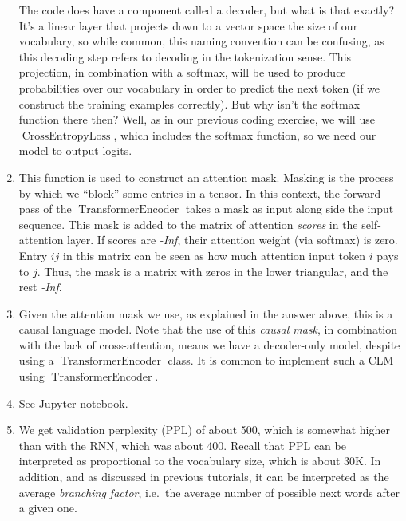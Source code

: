 \documentclass[11pt,a4paper]{article}
\newcommand\op[1]{\operatorname{#1}}
\begin{document}
\begin{enumerate}[label=(\alph*)]
          The code does have a component called a decoder, but what is that
          exactly?
          It's a linear layer that projects down to a vector space the size of
          our vocabulary, so while common, this naming convention can be
          confusing, as this decoding step refers to decoding in the
          tokenization sense.
          This projection, in combination with a softmax, will be used to
          produce probabilities over our vocabulary in order to predict the next
          token (if we construct the training examples correctly).
          But why isn't the softmax function there then?
          Well, as in our previous coding exercise, we will use
          $\op{CrossEntropyLoss}$, which includes the softmax function, so we
          need our model to output logits.
    \item This function is used to construct an attention mask.
          Masking is the process by which we ``block'' some entries in a tensor.
          In this context, the forward pass of the $\op{TransformerEncoder}$
          takes a mask as input along side the input sequence.
          This mask is added to the matrix of attention \emph{scores} in the
          self-attention layer.
          If scores are \emph{-Inf}, their attention weight (via softmax) is
          zero.
          Entry $ij$ in this matrix can be seen as how much attention input
          token $i$ pays to $j$.
          Thus, the mask is a matrix with zeros in the lower triangular, and
          the rest \emph{-Inf}.
    \item Given the attention mask we use, as explained in the answer above,
          this is a causal language model.
          Note that the use of this \emph{causal mask}, in combination with the
          lack of cross-attention, means we have a decoder-only model, despite
          using a $\op{TransformerEncoder}$ class.
          It is common to implement such a CLM using $\op{TransformerEncoder}$.
    \item See Jupyter notebook.
    \item We get validation perplexity (PPL) of about 500, which is somewhat
          higher than with the RNN, which was about 400.
          Recall that PPL can be interpreted as proportional to the vocabulary
          size, which is about 30K.
          In addition, and as discussed in previous tutorials, it can be
          interpreted as the average \emph{branching factor}, i.e.\ the average
          number of possible next words after a given one.


\end{enumerate}
\end{document}
